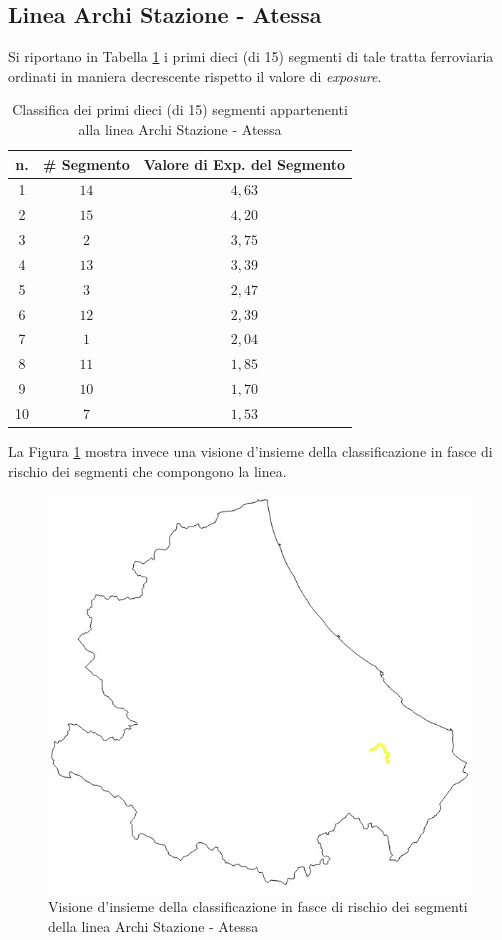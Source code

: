 \subsection{Linea Archi Stazione - Atessa}
Si riportano in Tabella \ref{classificaarchiatessa} i primi dieci (di 15) segmenti di tale tratta ferroviaria ordinati in maniera decrescente rispetto il valore di \textit{exposure}.
\begin{table}[h]
\centering
\begin{tabular}{|c|c|c|}
\hline
\rowcolor{lightgray}
n. & \# Segmento & Valore di Exp. del Segmento \\ \hline \rowcolor{icterine}
1  & $14$        & $4,63$                      \\ \hline \rowcolor{icterine}
2  & $15$        & $4,20$                      \\ \hline \rowcolor{icterine}
3  & $2$        & $3,75$                      \\ \hline \rowcolor{icterine}
4  & $13$        & $3,39$                      \\ \hline \rowcolor{icterine}
5  & $3$        & $2,47$                      \\ \hline \rowcolor{icterine}
6  & $12$        & $2,39$                      \\ \hline \rowcolor{icterine}
7  & $1$       & $2,04$                      \\ \hline \rowcolor{icterine}
8  & $11$        & $1,85$                      \\ \hline \rowcolor{icterine}
9  & $10$        & $1,70$                      \\ \hline \rowcolor{icterine}
10 & $7$        & $1,53$                      \\ \hline
\end{tabular}
\caption{Classifica dei primi dieci (di 15) segmenti appartenenti alla linea Archi Stazione - Atessa}
\label{classificaarchiatessa}
\end{table}
\newline
La Figura \ref{archiatessa} mostra invece una visione d'insieme della classificazione in fasce di rischio dei segmenti che compongono la linea.
\begin{figure}[h]
\centering
\includegraphics[width=0.4\linewidth]{img/archiatessa.jpeg}
\caption{Visione d'insieme della classificazione in fasce di rischio dei segmenti della linea Archi Stazione - Atessa}
\label{archiatessa}
\end{figure}
